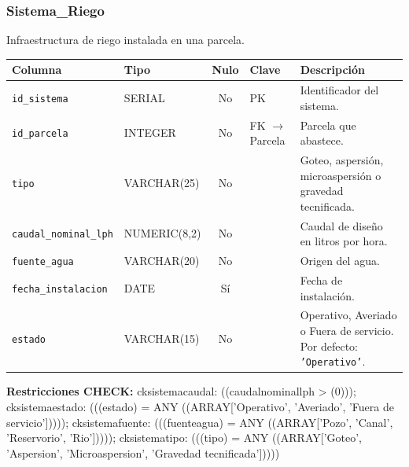 \documentclass[11pt,letterpaper]{article}
\newcommand{\tbus}{\textunderscore\allowbreak}
\newcommand{\tb}[1]{{\ttfamily\let\_\tbus #1}}
\begin{document}
\subsubsection*{Sistema\_Riego}
Infraestructura de riego instalada en una parcela.
{\footnotesize
\begin{longtable}{>{\raggedright\arraybackslash}p{3.3cm}>{\raggedright\arraybackslash}p{2.5cm}c>{\raggedright\arraybackslash}p{2.2cm}>{\raggedright\arraybackslash}p{6.1cm}}
\toprule
\textbf{Columna} & \textbf{Tipo} & \textbf{Nulo} & \textbf{Clave} & \textbf{Descripción} \\
\midrule
\endhead
\texttt{id\_sistema} & SERIAL & No & PK & Identificador del sistema. \\
\texttt{id\_parcela} & INTEGER & No & FK $\to$ Parcela & Parcela que abastece. \\
\texttt{tipo} & VARCHAR(25) & No &  & Goteo, aspersión, microaspersión o gravedad tecnificada. \\
\texttt{caudal\_nominal\_lph} & NUMERIC(8,2) & No &  & Caudal de diseño en litros por hora. \\
\texttt{fuente\_agua} & VARCHAR(20) & No &  & Origen del agua. \\
\texttt{fecha\_instalacion} & DATE & Sí &  & Fecha de instalación. \\
\texttt{estado} & VARCHAR(15) & No &  & Operativo, Averiado o Fuera de servicio. Por defecto: \texttt{'Operativo'}. \\
\bottomrule
\end{longtable}}
{\footnotesize\raggedright\textbf{Restricciones CHECK:} \tb{ck\_sistema\_caudal}: \tb{((caudal\_nominal\_lph > (0)))}; \tb{ck\_sistema\_estado}: \tb{(((estado) = ANY ((ARRAY['Operativo', 'Averiado', 'Fuera de servicio']))))}; \tb{ck\_sistema\_fuente}: \tb{(((fuente\_agua) = ANY ((ARRAY['Pozo', 'Canal', 'Reservorio', 'Rio']))))}; \tb{ck\_sistema\_tipo}: \tb{(((tipo) = ANY ((ARRAY['Goteo', 'Aspersion', 'Microaspersion', 'Gravedad tecnificada']))))}\par}
\medskip
\end{document}
